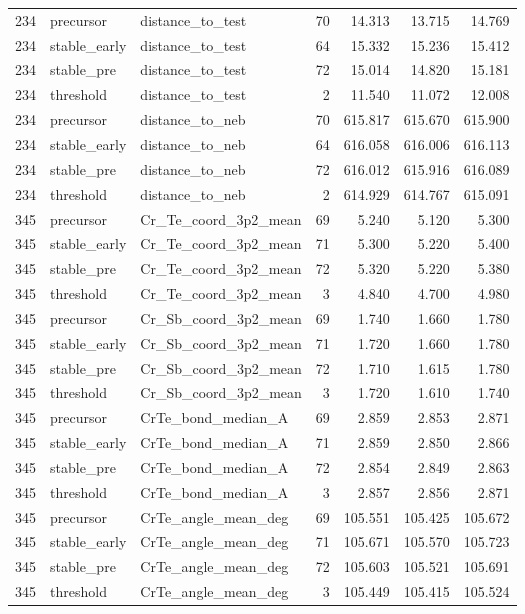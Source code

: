 \begin{tabular}{lllrrrr}
234 & precursor & distance_to_test & 70 & 14.313 & 13.715 & 14.769 \\
234 & stable_early & distance_to_test & 64 & 15.332 & 15.236 & 15.412 \\
234 & stable_pre & distance_to_test & 72 & 15.014 & 14.820 & 15.181 \\
234 & threshold & distance_to_test & 2 & 11.540 & 11.072 & 12.008 \\
234 & precursor & distance_to_neb & 70 & 615.817 & 615.670 & 615.900 \\
234 & stable_early & distance_to_neb & 64 & 616.058 & 616.006 & 616.113 \\
234 & stable_pre & distance_to_neb & 72 & 616.012 & 615.916 & 616.089 \\
234 & threshold & distance_to_neb & 2 & 614.929 & 614.767 & 615.091 \\
345 & precursor & Cr_Te_coord_3p2_mean & 69 & 5.240 & 5.120 & 5.300 \\
345 & stable_early & Cr_Te_coord_3p2_mean & 71 & 5.300 & 5.220 & 5.400 \\
345 & stable_pre & Cr_Te_coord_3p2_mean & 72 & 5.320 & 5.220 & 5.380 \\
345 & threshold & Cr_Te_coord_3p2_mean & 3 & 4.840 & 4.700 & 4.980 \\
345 & precursor & Cr_Sb_coord_3p2_mean & 69 & 1.740 & 1.660 & 1.780 \\
345 & stable_early & Cr_Sb_coord_3p2_mean & 71 & 1.720 & 1.660 & 1.780 \\
345 & stable_pre & Cr_Sb_coord_3p2_mean & 72 & 1.710 & 1.615 & 1.780 \\
345 & threshold & Cr_Sb_coord_3p2_mean & 3 & 1.720 & 1.610 & 1.740 \\
345 & precursor & CrTe_bond_median_A & 69 & 2.859 & 2.853 & 2.871 \\
345 & stable_early & CrTe_bond_median_A & 71 & 2.859 & 2.850 & 2.866 \\
345 & stable_pre & CrTe_bond_median_A & 72 & 2.854 & 2.849 & 2.863 \\
345 & threshold & CrTe_bond_median_A & 3 & 2.857 & 2.856 & 2.871 \\
345 & precursor & CrTe_angle_mean_deg & 69 & 105.551 & 105.425 & 105.672 \\
345 & stable_early & CrTe_angle_mean_deg & 71 & 105.671 & 105.570 & 105.723 \\
345 & stable_pre & CrTe_angle_mean_deg & 72 & 105.603 & 105.521 & 105.691 \\
345 & threshold & CrTe_angle_mean_deg & 3 & 105.449 & 105.415 & 105.524 \\

\end{tabular}
